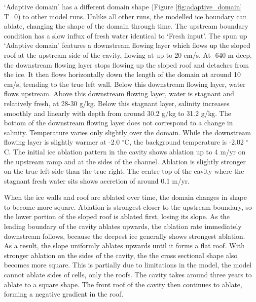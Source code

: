 `Adaptive domain' has a different domain shape (Figure \ref{fig:adaptive_domain} T=0) to other model runs. Unlike all other runs, the modelled ice boundary can ablate, changing the shape of the domain through time. The upstream boundary condition has a slow influx of fresh water identical to `Fresh input'.
The spun up `Adaptive domain' features a downstream flowing layer which flows up the sloped roof at the upstream side of the cavity, flowing at up to 20 cm/s. At -640 m deep, the downstream flowing layer stops flowing up the sloped roof and detaches from the ice. It then flows horizontally down the length of the domain at around 10 cm/s, trending to the true left wall. Below this downstream flowing layer, water flows upstream. Above this downstream flowing layer, water is stagnant and relatively fresh, at 28-30 g/kg. Below this stagnant layer, salinity increases smoothly and linearly with depth from around 30.2 g/kg to 31.2 g/kg. The bottom of the downstream flowing layer does not correspond to a change in salinity. Temperature varies only slightly over the domain. While the downstream flowing layer is slightly warmer at -2.0 $^\circ$C, the background temperature is -2.02 $^\circ$C. 
The initial ice ablation pattern in the cavity shows ablation up to 4 m/yr on the upstream ramp and at the sides of the channel. Ablation is slightly stronger on the true left side than the true right.  The centre top of the cavity where the stagnant fresh water sits shows accretion of around 0.1 m/yr.

When the ice walls and roof are ablated over time, the domain changes in shape to become more square. Ablation is strongest closer to the upstream boundary, so the lower portion of the sloped roof is ablated first, losing its slope. As the leading boundary of the cavity ablates upwards, the ablation rate immediately downstream follows, because the deepest ice generally shows strongest ablation. As a result, the slope uniformly ablates upwards until it forms a flat roof. With stronger ablation on the sides of the cavity, the the cross sectional shape also becomes more square. This is partially due to limitations in the model, the model cannot ablate sides of cells, only the roofs. The cavity takes around three years to ablate to a square shape. The front roof of the cavity then continues to ablate, forming a negative gradient in the roof.


